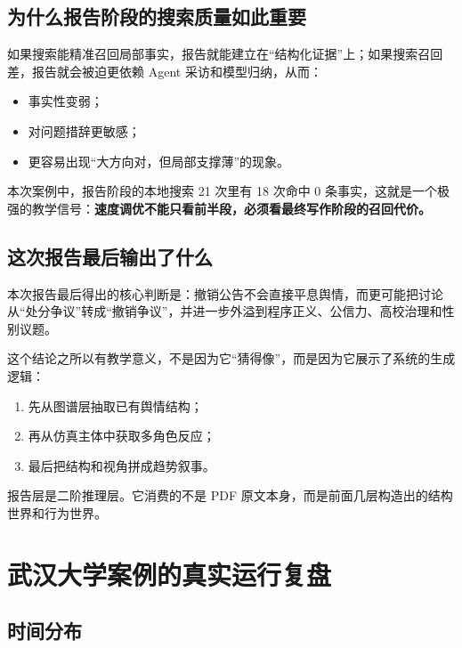 \documentclass[UTF8,10pt,oneside]{ctexbook}
\begin{document}
\section{为什么报告阶段的搜索质量如此重要}

如果搜索能精准召回局部事实，报告就能建立在“结构化证据”上；如果搜索召回差，报告就会被迫更依赖 Agent 采访和模型归纳，从而：

\begin{itemize}
  \item 事实性变弱；
  \item 对问题措辞更敏感；
  \item 更容易出现“大方向对，但局部支撑薄”的现象。
\end{itemize}

本次案例中，报告阶段的本地搜索 21 次里有 18 次命中 0 条事实，这就是一个极强的教学信号：\textbf{速度调优不能只看前半段，必须看最终写作阶段的召回代价。}

\section{这次报告最后输出了什么}

本次报告最后得出的核心判断是：撤销公告不会直接平息舆情，而更可能把讨论从“处分争议”转成“撤销争议”，并进一步外溢到程序正义、公信力、高校治理和性别议题。

这个结论之所以有教学意义，不是因为它“猜得像”，而是因为它展示了系统的生成逻辑：

\begin{enumerate}
  \item 先从图谱层抽取已有舆情结构；
  \item 再从仿真主体中获取多角色反应；
  \item 最后把结构和视角拼成趋势叙事。
\end{enumerate}

\begin{takeawaybox}[本章核心结论]
报告层是二阶推理层。它消费的不是 PDF 原文本身，而是前面几层构造出的结构世界和行为世界。
\end{takeawaybox}

\chapter{武汉大学案例的真实运行复盘}

\section{时间分布}
\end{document}
